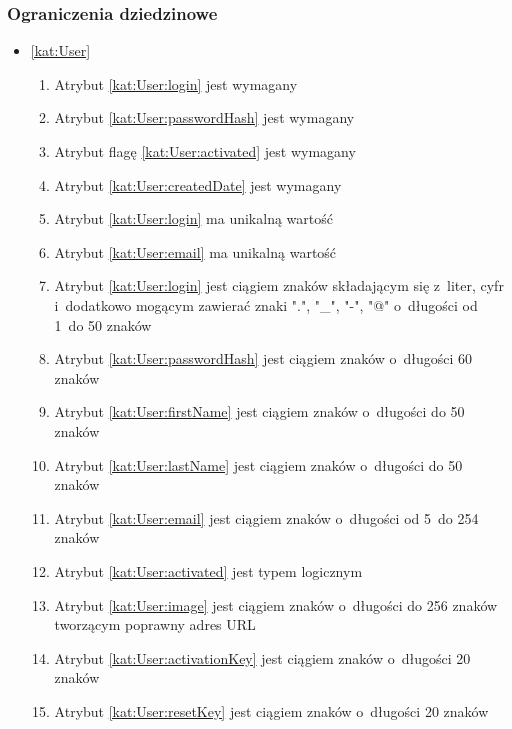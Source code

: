 \subsubsection{Ograniczenia dziedzinowe}\label{subsubsec:database:gateway:restrictions}

\begin{itemize}[label={\textbf{Ograniczenia dla}}, wide, labelwidth=!, labelindent=0pt]
    \setlength\itemsep{1.75em}
    \item\ref{kat:User}\mynobreakpar
    \begin{enumerate}[label={\textbf{OGR/0/\protect\twodigits{\arabic{enumi}}}}, wide, labelwidth=!, align=left, leftmargin=3cm]
        \item Atrybut \ref{kat:User:login} jest wymagany
        \item Atrybut \ref{kat:User:passwordHash} jest wymagany
        \item Atrybut flagę \ref{kat:User:activated} jest wymagany
        \item Atrybut \ref{kat:User:createdDate} jest wymagany
        \item Atrybut \ref{kat:User:login} ma unikalną wartość
        \item Atrybut \ref{kat:User:email} ma unikalną wartość
        \item Atrybut \ref{kat:User:login} jest ciągiem znaków składającym się z~liter, cyfr i~dodatkowo mogącym zawierać znaki ".", "\_", "-", "@" o~długości od 1~do 50 znaków
        \item Atrybut \ref{kat:User:passwordHash} jest ciągiem znaków o~długości 60 znaków
        \item Atrybut \ref{kat:User:firstName} jest ciągiem znaków o~długości do 50 znaków
        \item Atrybut \ref{kat:User:lastName} jest ciągiem znaków o~długości do 50 znaków
        \item Atrybut \ref{kat:User:email} jest ciągiem znaków o~długości od 5~do 254 znaków
        \item Atrybut \ref{kat:User:activated} jest typem logicznym
        \item Atrybut \ref{kat:User:image} jest ciągiem znaków o~długości do 256 znaków tworzącym poprawny adres URL
        \item Atrybut \ref{kat:User:activationKey} jest ciągiem znaków o~długości 20 znaków
        \item Atrybut \ref{kat:User:resetKey} jest ciągiem znaków o~długości 20 znaków

\end{enumerate}
\end{itemize}
